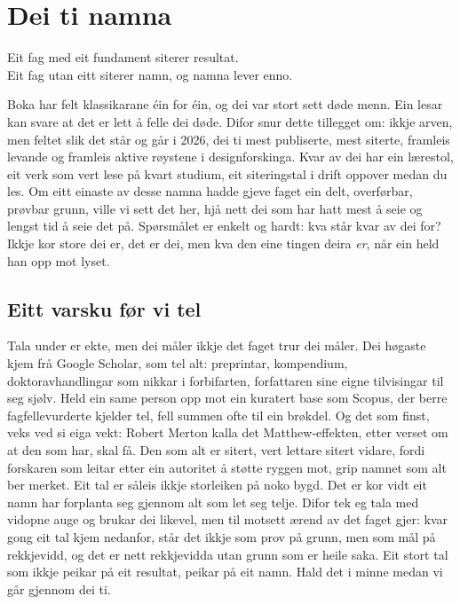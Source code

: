 \chapter{Dei ti namna}

\begin{motto}
Eit fag med eit fundament siterer resultat.\\ Eit fag utan eitt siterer namn, og namna lever enno.
\end{motto}

Boka har felt klassikarane éin for éin, og dei var stort sett døde menn. Ein lesar kan svare at det er lett å felle dei døde. Difor snur dette tillegget om: ikkje arven, men feltet slik det står og går i 2026, dei ti mest publiserte, mest siterte, framleis levande og framleis aktive røystene i designforskinga. Kvar av dei har ein lærestol, eit verk som vert lese på kvart studium, eit siteringstal i drift oppover medan du les. Om eitt einaste av desse namna hadde gjeve faget ein delt, overførbar, prøvbar grunn, ville vi sett det her, hjå nett dei som har hatt mest å seie og lengst tid å seie det på. Spørsmålet er enkelt og hardt: kva står kvar av dei for? Ikkje kor store dei er, det er dei, men kva den eine tingen deira \emph{er}, når ein held han opp mot lyset.


\section{Eitt varsku før vi tel}

Tala under er ekte, men dei måler ikkje det faget trur dei måler. Dei høgaste kjem frå Google Scholar, som tel alt: preprintar, kompendium, doktoravhandlingar som nikkar i forbifarten, forfattaren sine eigne tilvisingar til seg sjølv. Held ein same person opp mot ein kuratert base som Scopus, der berre fagfellevurderte kjelder tel, fell summen ofte til ein brøkdel. Og det som finst, veks ved si eiga vekt: Robert Merton kalla det Matthew-effekten, etter verset om at den som har, skal få. Den som alt er sitert, vert lettare sitert vidare, fordi forskaren som leitar etter ein autoritet å støtte ryggen mot, grip namnet som alt ber merket. Eit tal er såleis ikkje storleiken på noko bygd. Det er kor vidt eit namn har forplanta seg gjennom alt som let seg telje. Difor tek eg tala med vidopne auge og brukar dei likevel, men til motsett ærend av det faget gjer: kvar gong eit tal kjem nedanfor, står det ikkje som prov på grunn, men som mål på rekkjevidd, og det er nett rekkjevidda utan grunn som er heile saka. Eit stort tal som ikkje peikar på eit resultat, peikar på eit namn. Hald det i minne medan vi går gjennom dei ti.

